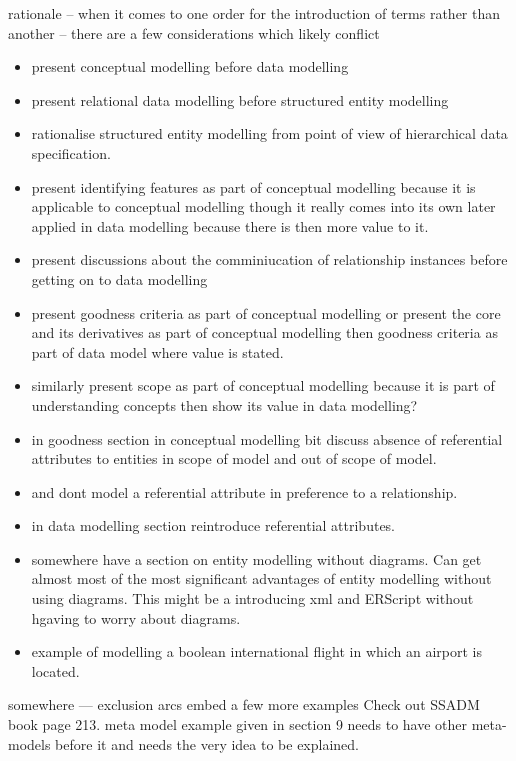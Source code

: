 \mynote rationale -- when it comes to one order for the introduction of terms rather than another -- there are a few considerations which likely conflict
\begin{itemize}
	\item  present conceptual modelling before data modelling
	\item  present relational data modelling before structured entity modelling
	\item rationalise structured entity modelling from point of view of hierarchical data specification. 
	\item  present identifying features as part of conceptual modelling because
	it is applicable to conceptual modelling though it really comes into its own
	later applied in data modelling
	because there is then more value to it.
	\item present discussions about the comminiucation of relationship instances before 
		getting on to data modelling
	\item   present goodness criteria as part of conceptual modelling
	or present the core and its derivatives as part of conceptual modelling then goodness criteria as part of data model where value is stated.
	\item similarly present scope as part of conceptual modelling because it is part of understanding concepts then show its value in data modelling? 
	\item in goodness section in conceptual modelling bit discuss absence of referential attributes to entities in scope of model and out of scope of model.
	\item and dont model a referential attribute in preference to a relationship.
	\item in data modelling section reintroduce referential attributes. 
	\item somewhere have a section on entity modelling without diagrams. Can get almost most of the most significant advantages of entity modelling without using diagrams. This might be a  introducing xml and ERScript without hgaving to worry about diagrams.
	\item example of modelling a boolean international flight in which an airport is located.
\end{itemize}

\mynote somewhere --- exclusion arcs
\mynote embed a few more examples Check out SSADM book page 213. 
\mynote meta model example given in section 9 needs to have other meta-models before it and needs the very idea to be explained.

